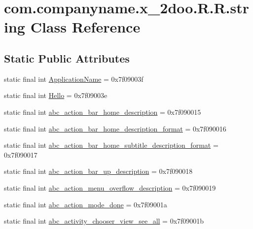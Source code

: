 \hypertarget{classcom_1_1companyname_1_1x__2doo_1_1_r_1_1string}{
\section{com.companyname.x\_\-2doo.R.R.string Class Reference}
\label{classcom_1_1companyname_1_1x__2doo_1_1_r_1_1string}
}
\subsection*{Static Public Attributes}
\begin{CompactItemize}
\item 
static final int \hyperlink{classcom_1_1companyname_1_1x__2doo_1_1_r_1_1string_820d3fd8e99f745abda1ba5933d8f30e}{ApplicationName} = 0x7f09003f
\item 
static final int \hyperlink{classcom_1_1companyname_1_1x__2doo_1_1_r_1_1string_d93f30488c1814926ca0f4b419e0cdfc}{Hello} = 0x7f09003e
\item 
static final int \hyperlink{classcom_1_1companyname_1_1x__2doo_1_1_r_1_1string_7dba15f47cc9ce3a23b5b920370ca7ac}{abc\_\-action\_\-bar\_\-home\_\-description} = 0x7f090015
\item 
static final int \hyperlink{classcom_1_1companyname_1_1x__2doo_1_1_r_1_1string_4c88e485f74415a938c30d31e49526c4}{abc\_\-action\_\-bar\_\-home\_\-description\_\-format} = 0x7f090016
\item 
static final int \hyperlink{classcom_1_1companyname_1_1x__2doo_1_1_r_1_1string_4a6b16ffd89d5e5307749fd79bd2f1fa}{abc\_\-action\_\-bar\_\-home\_\-subtitle\_\-description\_\-format} = 0x7f090017
\item 
static final int \hyperlink{classcom_1_1companyname_1_1x__2doo_1_1_r_1_1string_3474d70b687b9adc55b2b05ce6b17aa9}{abc\_\-action\_\-bar\_\-up\_\-description} = 0x7f090018
\item 
static final int \hyperlink{classcom_1_1companyname_1_1x__2doo_1_1_r_1_1string_375d12c10d6022ba1b63eab4a7042821}{abc\_\-action\_\-menu\_\-overflow\_\-description} = 0x7f090019
\item 
static final int \hyperlink{classcom_1_1companyname_1_1x__2doo_1_1_r_1_1string_d7cd21f71c6395c32be6ea326ac4239e}{abc\_\-action\_\-mode\_\-done} = 0x7f09001a
\item 
static final int \hyperlink{classcom_1_1companyname_1_1x__2doo_1_1_r_1_1string_684149c3f149d92e0fc5c0146d4a757f}{abc\_\-activity\_\-chooser\_\-view\_\-see\_\-all} = 0x7f09001b

\end{CompactItemize}
